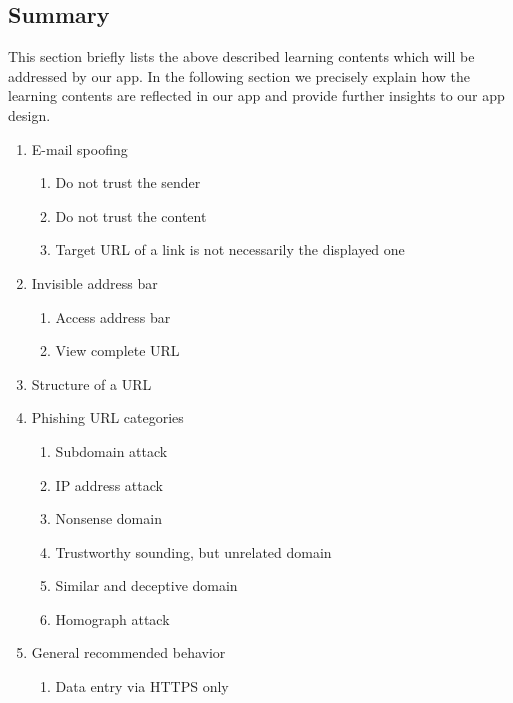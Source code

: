 

\subsection{Summary}

This section briefly lists the above described learning contents which will be addressed by our app.
In the following section we precisely explain how the learning contents are reflected in our app and provide further insights to our app design.

\begin{enumerate}
	\item E-mail spoofing 
	\begin{enumerate}
		\item Do not trust the sender
		\item Do not trust the content
		\item Target URL of a link is not necessarily the displayed one
	\end{enumerate}
	\item Invisible address bar
	\begin{enumerate}
		\item Access address bar
		\item View complete URL
	\end{enumerate}
	\item Structure of a URL
	\item Phishing URL categories
	\begin{enumerate}
		\item Subdomain attack
		\item IP address attack
		\item Nonsense domain
		\item Trustworthy sounding, but unrelated domain
		\item Similar and deceptive domain
		\item Homograph attack
	\end{enumerate}
	\item General recommended behavior
	\begin{enumerate}
		\item Data entry via HTTPS only
	\end{enumerate}
	
\end{enumerate}
